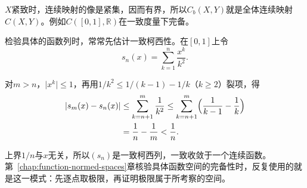 $X$紧致时，连续映射的像是紧集，因而有界，所以$C_b(X,Y)$就是全体连续映射$C(X,Y)$。例如$C([0,1],\mathbb R)$在一致度量下完备。

检验具体的函数列时，常常先估计一致柯西性。在$[0,1]$上令
\[
 s_n(x)=\sum_{k=1}^n\frac{x^k}{k^2}.
\]

对$m>n$，$\lvert x^k\rvert\leq1$，再用$1/k^2\leq1/(k-1)-1/k$（$k\geq2$）裂项，得
\[
 \begin{aligned}
 \lvert s_m(x)-s_n(x)\rvert
 &\leq\sum_{k=n+1}^m\frac1{k^2}
 \leq\sum_{k=n+1}^m\Bigl(\frac1{k-1}-\frac1k\Bigr)\\
 &=\frac1n-\frac1m<\frac1n.
 \end{aligned}
\]

上界$1/n$与$x$无关，所以$(s_n)$是一致柯西列，一致收敛于一个连续函数。第~\ref{chap:function-normed-spaces}章核验具体函数空间的完备性时，反复使用的就是这一模式：先逐点取极限，再证明极限属于所考察的空间。
